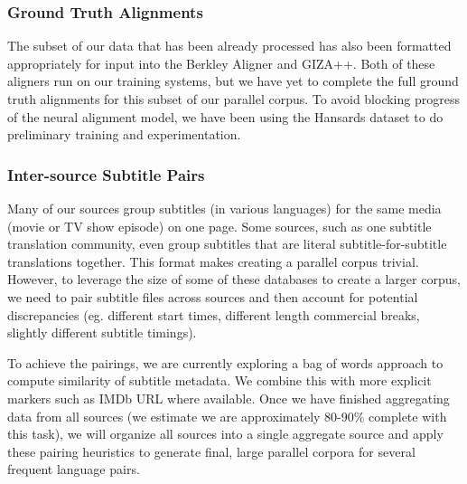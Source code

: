 \documentclass[twoside,twocolumn]{article}
\begin{document}
\subsubsection{Ground Truth Alignments}

The subset of our data that has been already processed has also been formatted
appropriately for input into the Berkley Aligner and GIZA++. Both of these
aligners run on our training systems, but we have yet to complete the full
ground truth alignments for this subset of our parallel corpus. To avoid
blocking progress of the neural alignment model, we have been using the
Hansards dataset to do preliminary training and experimentation.

\subsubsection{Inter-source Subtitle Pairs}

Many of our sources group subtitles (in various languages) for the same media
(movie or TV show episode) on one page. Some sources, such as one subtitle
translation community, even group subtitles that are literal
subtitle-for-subtitle translations together. This format makes creating a
parallel corpus trivial. However, to leverage the size of some of these
databases to create a larger corpus, we need to pair subtitle files across
sources and then account for potential discrepancies (eg. different start
times, different length commercial breaks, slightly different subtitle
timings).

To achieve the pairings, we are currently exploring a bag of words approach to
compute similarity of subtitle metadata. We combine this with more explicit
markers such as IMDb URL where available. Once we have finished aggregating
data from all sources (we estimate we are approximately 80-90\% complete with
this task), we will organize all sources into a single aggregate source and
apply these pairing heuristics to generate final, large parallel corpora for
several frequent language pairs.





\end{document}
